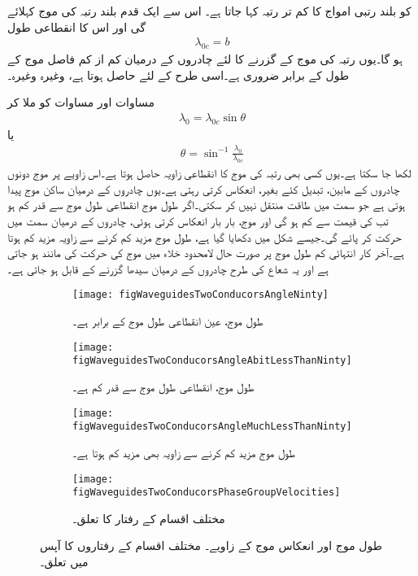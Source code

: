  کو بلند رتبی  امواج کا کم تر رتبہ کہا جاتا ہے۔ اس سے ایک قدم بلند  رتبہ کی موج کہلائے گی اور اس کا انقطاعی طول
\begin{align}
\lambda_{0c}=b
\end{align}
ہو گا۔یوں  رتبہ کی  موج کے گزرنے کا لئے چادروں کے درمیان کم از کم فاصل موج کے طول کے برابر ضروری ہے۔اسی طرح  کے لئے  حاصل ہوتا ہے، وغیرہ وغیرہ۔

مساوات  اور مساوات  کو ملا کر
\begin{align}
\lambda_0=\lambda_{0c} \sin \theta
\end{align}
یا
\begin{align}
\theta=\sin^{-1}\frac{\lambda_0}{\lambda_{0c}}
\end{align}
لکھا جا سکتا ہے۔یوں کسی بھی رتبہ کی موج کا انقطاعی زاویہ  حاصل ہوتا ہے۔اس زاویے پر موج  دونوں چادروں کے مابین،  تبدیل کئے بغیر،  انعکاس کرتی رہتی ہے۔یوں چادروں کے درمیان ساکن موج پیدا ہوتی ہے جو  سمت میں طاقت منتقل نہیں کر سکتی۔اگر طول موج  انقطاعی طول موج  سے قدر کم ہو تب  کی قیمت  سے کم ہو گی اور موج، بار بار انعکاس کرتی ہوئی، چادروں کے درمیان  سمت میں حرکت کر پائے گی۔جیسے شکل  میں دکھایا گیا ہے، طول موج مزید کم کرنے سے زاویہ مزید کم ہوتا ہے۔آخر کار انتہائی کم طول موج پر صورت حال لامحدود خلاء میں موج کی حرکت کی مانند ہو جاتی ہے اور یہ شعاع کی طرح چادروں کے درمیان سیدھا گزرنے کے قابل ہو جاتی ہے۔

\begin{figure}
\centering
\begin{subfigure}{0.5\textwidth}
\centering
\texttt{[image: figWaveguidesTwoConducorsAngleNinty]}
\caption{طول موج، عین انقطاعی طول موج کے برابر ہے۔}
\end{subfigure}%
%
\begin{subfigure}{0.5\textwidth}
\centering
\texttt{[image: figWaveguidesTwoConducorsAngleAbitLessThanNinty]}
\caption{طول موج، انقطاعی طول موج سے قدر کم ہے۔}
\end{subfigure}%

\begin{subfigure}{0.4\textwidth}
\centering
\texttt{[image: figWaveguidesTwoConducorsAngleMuchLessThanNinty]}
\caption{طول موج مزید کم کرنے سے زاویہ بھی مزید کم ہوتا ہے۔}
\end{subfigure}%
\begin{subfigure}{0.4\textwidth}
\centering
\texttt{[image: figWaveguidesTwoConducorsPhaseGroupVelocities]}
\caption{مختلف اقسام کے رفتار کا تعلق۔}
\end{subfigure}%
\caption{طول موج اور انعکاس موج کے زاویے۔ مختلف اقسام کے رفتاروں کا آپس میں تعلق۔}
\label{شکل_مویج_طول_موج_اور_زاویہ_انعاکس}
\end{figure}


